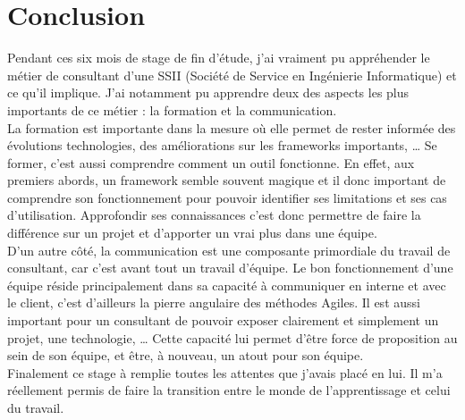 \chapter*{Conclusion}

Pendant ces six mois de stage de fin d'étude, j'ai vraiment pu appréhender le métier de consultant d'une SSII (Société de Service en Ingénierie Informatique) et ce qu'il implique. J'ai notamment pu apprendre deux des  aspects les plus importants de ce métier : la formation et la communication.\\

La formation est importante dans la mesure où elle permet de rester informée des évolutions technologies, des améliorations sur les frameworks importants, \dots{} Se former, c'est aussi comprendre comment un outil fonctionne. En effet, aux premiers abords, un framework semble souvent \og magique \fg{} et il donc important de comprendre son fonctionnement pour pouvoir identifier ses limitations et ses cas d'utilisation. Approfondir ses connaissances c'est donc permettre de faire la différence sur un projet et d'apporter un vrai plus dans une équipe.\\


D'un autre côté, la communication est une composante primordiale du travail de consultant, car c'est avant tout un travail d'équipe. Le bon fonctionnement d'une équipe réside principalement dans sa capacité à communiquer en interne et avec le client, c'est d'ailleurs la pierre angulaire des méthodes Agiles. Il est aussi important pour un consultant  de pouvoir exposer clairement et simplement un projet, une technologie, \dots{} Cette capacité lui permet d'être force de proposition au sein de son équipe, et être, à nouveau, un atout pour son équipe.\\

Finalement ce stage à remplie toutes les attentes que j'avais placé en lui. Il m'a réellement permis de faire la transition entre le monde de l'apprentissage et celui du travail. 
